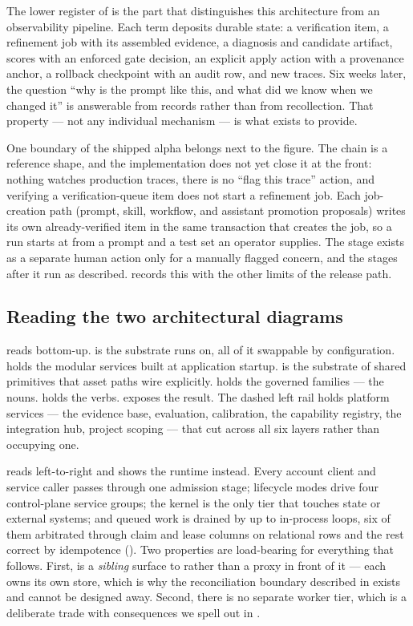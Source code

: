 The lower register of  is the part that distinguishes this
architecture from an observability pipeline. Each term deposits durable state: a
verification item, a refinement job with its assembled evidence, a diagnosis and
candidate artifact, scores with an enforced gate decision, an explicit apply action
with a provenance anchor, a rollback checkpoint with an audit row, and new traces.
Six weeks later, the question ``why is the prompt like this, and what did we know
when we changed it'' is answerable from records rather than from recollection.
That property --- not any individual mechanism --- is what \sys exists to provide.

One boundary of the shipped alpha belongs next to the figure. The chain is a
reference shape, and the implementation does not yet close it at the front: nothing
watches production traces, there is no ``flag this trace'' action, and verifying a
verification-queue item does not start a refinement job. Each job-creation path
(prompt, skill, workflow, and assistant promotion proposals) writes its own
already-verified item in the same transaction that creates the job, so a run starts
at  from a prompt and a test set an operator supplies. The
 stage exists as a separate human action only for a manually flagged
concern, and the stages after it run as described.  records
this with the other limits of the release path.

\subsection{Reading the two architectural diagrams}

 reads bottom-up. \Linfra{} is the substrate \sys runs on, all
of it swappable by configuration. \Lkernel{} holds the modular services built at
application startup. \Lgov{} is the substrate of shared primitives that asset
paths wire explicitly. \Lfam{} holds the \statFamiliesW{} governed families --- the
nouns. \Lmode{} holds the verbs. \Lsurf{} exposes the result. The dashed left rail
holds platform services --- the evidence base, evaluation, calibration, the
capability registry, the integration hub, project scoping --- that cut across all
six layers rather than occupying one.

 reads left-to-right and shows the runtime instead. Every
account client and service caller passes through one admission stage; lifecycle
modes drive four control-plane service groups; the kernel is the only tier that
touches state or external systems; and queued work is drained by up to
\statLoopsW{} in-process loops, six of them arbitrated through claim and lease
columns on relational rows and the rest correct by idempotence
(). Two properties are load-bearing for everything that follows.
First, \sys is a \emph{sibling} surface to \mlflow{} rather than a proxy in front
of it --- each owns its own store, which is why the reconciliation boundary
described in  exists and cannot be designed away. Second, there is no
separate worker tier, which is a deliberate trade with consequences we spell out
in .
